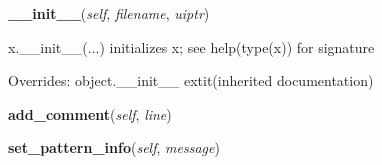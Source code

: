     \vspace{0.5ex}

\hspace{.8\funcindent}\begin{boxedminipage}{\funcwidth}

    \raggedright \textbf{\_\_init\_\_}(\textit{self}, \textit{filename}, \textit{uiptr})

\setlength{\parskip}{2ex}
    x.\_\_init\_\_(...) initializes x; see help(type(x)) for signature

\setlength{\parskip}{1ex}
      Overrides: object.\_\_init\_\_ 	extit{(inherited documentation)}

    \end{boxedminipage}

    \label{htd_hpl_itpp_interface:hpl_itpp_interface:add_comment}

    \vspace{0.5ex}

\hspace{.8\funcindent}\begin{boxedminipage}{\funcwidth}

    \raggedright \textbf{add\_comment}(\textit{self}, \textit{line})

\setlength{\parskip}{2ex}
\setlength{\parskip}{1ex}
    \end{boxedminipage}

    \label{htd_hpl_itpp_interface:hpl_itpp_interface:set_pattern_info}

    \vspace{0.5ex}

\hspace{.8\funcindent}\begin{boxedminipage}{\funcwidth}

    \raggedright \textbf{set\_pattern\_info}(\textit{self}, \textit{message})

\setlength{\parskip}{2ex}
\setlength{\parskip}{1ex}
    \end{boxedminipage}

    \label{htd_hpl_itpp_interface:hpl_itpp_interface:signal_force}

